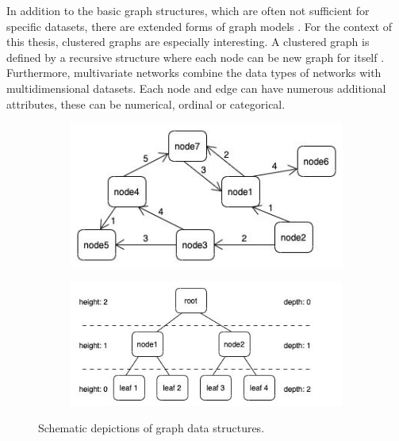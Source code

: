 In addition to the basic graph structures, which are often not sufficient for specific datasets, there are extended forms of graph models \cite{bertault_algorithm_1999}. 
For the context of this thesis, clustered graphs are especially interesting. A clustered graph is defined by a recursive structure where each node can be new graph for itself \cite{eades_multilevel_1997}.\\ 
Furthermore, multivariate networks \cite{kerren_introduction_2014} combine the data types of networks with multidimensional datasets. Each node and edge can have numerous additional attributes, these can be numerical, ordinal or categorical.

\begin{figure}[h]
    \centering
    \begin{subfigure}[b]{0.45\columnwidth}
        \centering
        \includegraphics[width=\textwidth]{graphics/weightedDirectedNetwork.jpg}
        \label{fig:simple_weighted_directed_network}
    \end{subfigure}
    \begin{subfigure}[b]{0.54\columnwidth}
        \centering
        \includegraphics[width=\textwidth]{graphics/basicTree.jpg}
        \label{fig:simple_tree}
    \end{subfigure}
    
    \caption{Schematic depictions of graph data structures.} %
    \label{fig:intro} 
  \end{figure}

